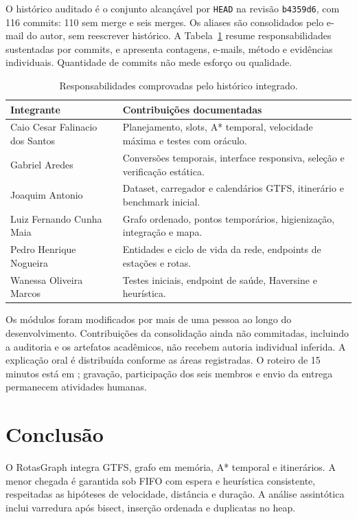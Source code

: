 \documentclass[12pt]{article}
\newcommand{\code}[1]{\texttt{#1}}
\begin{document}
O histórico auditado é o conjunto alcançável por \code{HEAD} na revisão \code{b4359d6}, com 116 commits: 110 sem merge e seis merges. Os aliases são consolidados pelo e-mail do autor, sem reescrever histórico. A Tabela~\ref{tab:authors} resume responsabilidades sustentadas por commits, e  apresenta contagens, e-mails, método e evidências individuais. Quantidade de commits não mede esforço ou qualidade.

\begin{table}[ht]
\centering
\caption{Responsabilidades comprovadas pelo histórico integrado.}
\label{tab:authors}
\begin{tabularx}{\textwidth}{@{}p{}X@{}}
\toprule Integrante & Contribuições documentadas \\
\midrule
Caio Cesar Falinacio dos Santos & Planejamento, slots, A* temporal, velocidade máxima e testes com oráculo. \\
Gabriel Aredes & Conversões temporais, interface responsiva, seleção e verificação estática. \\
Joaquim Antonio & Dataset, carregador e calendários GTFS, itinerário e benchmark inicial. \\
Luiz Fernando Cunha Maia & Grafo ordenado, pontos temporários, higienização, integração e mapa. \\
Pedro Henrique Nogueira & Entidades e ciclo de vida da rede, endpoints de estações e rotas. \\
Wanessa Oliveira Marcos & Testes iniciais, endpoint de saúde, Haversine e heurística. \\
\bottomrule
\end{tabularx}
\end{table}

Os módulos foram modificados por mais de uma pessoa ao longo do desenvolvimento. Contribuições da consolidação ainda não commitadas, incluindo a auditoria e os artefatos acadêmicos, não recebem autoria individual inferida. A explicação oral é distribuída conforme as áreas registradas. O roteiro de 15 minutos está em ; gravação, participação dos seis membros e envio da entrega permanecem atividades humanas.

\section{Conclusão}
O RotasGraph integra GTFS, grafo em memória, A* temporal e itinerários. A menor chegada é garantida sob FIFO com espera e heurística consistente, respeitadas as hipóteses de velocidade, distância e duração. A análise assintótica inclui varredura após bisect, inserção ordenada e duplicatas no heap.
\end{document}
